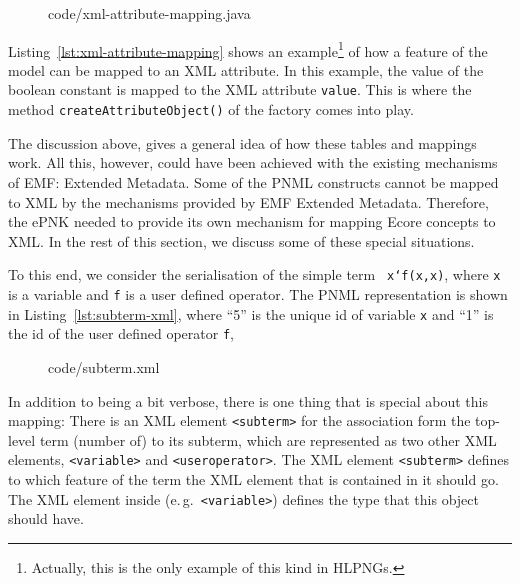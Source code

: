 \begin{figure}[tbp!] %
%
{code/xml-attribute-mapping.java}
\end{figure}
%
Listing~\ref{lst:xml-attribute-mapping} shows an example\footnote
  {Actually, this is the only example of this kind in HLPNGs.}
of how a feature of the model can be mapped to an XML attribute. In this
example, the value of the boolean constant is mapped to the XML attribute 
{\tt value}. This is where the method {\tt createAttributeObject()}%
of the factory comes into play.

The discussion above, gives a general idea of how these tables and mappings
work. All this, however, could have been achieved with the existing mechanisms
of EMF: Extended Metadata. Some of the PNML constructs cannot be
mapped to XML by the mechanisms provided by EMF Extended Metadata.
Therefore, the ePNK needed to provide its own mechanism for mapping
Ecore concepts to XML. In the rest of this section, we discuss some of
these special situations.

To this end, we consider the serialisation of the simple term {\tt
x`f(x,x)}, where {\tt x} is a variable and {\tt f} is a user defined operator.
The PNML representation is shown in Listing~\ref{lst:subterm-xml}, where ``5''
is the unique id of variable {\tt x} and ``1'' is the id of the user defined
operator {\tt f},
%
\begin{figure}[tbp!] %
%
{code/subterm.xml}
\end{figure}
%
In addition to being a bit verbose, there is one thing that is special about
this mapping: There is an XML element \verb+<subterm>+ for the association
form the top-level term (number of) to its subterm,
which are represented as two other XML elements,
\verb+<variable>+  and \verb+<useroperator>+. The XML element 
\verb+<subterm>+ defines to which feature of the term the XML element that is
contained in it should go. The XML element inside (e.\,g.\ 
\verb+<variable>+) defines the type that this object should have.

